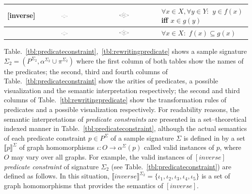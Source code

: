 \documentclass{eceasst}
\begin{document}
\begin{table}[h]
\begin{center}
\begin{tabular}{| l | c | c | p{6cm} | }
    [inverse] & \includegraphics[width=0.13\textwidth]{inv_1.pdf} & \includegraphics[width=0.16\textwidth]{inv_vis.pdf} & $\forall x \in X, \forall y \in Y :$  $y \in f(x)$ iff $x \in g(y) $  \\ \hline 
    [image-inclusion] & \includegraphics[width=0.13\textwidth]{img_1.pdf} & \includegraphics[width=0.16\textwidth]{img_vis.pdf} & $\forall x \in X :$  $f(x) \subseteq g(x) $  \\     
    \hline    
    \end{tabular}
    \end{center}
\end{table}







Table.~\ref{tbl:predicateconstraint},~\ref{tbl:rewritingpredicate} shows a sample signature $\Sigma_2 = (P^{\Sigma_2}, \alpha^{\Sigma_2} \cup \pi^{\Sigma_2})$ where the first column of 
both tables show the names of the predicates; the second, third and fourth columns of Table.~\ref{tbl:predicateconstraint} show the arities of predicates, a possible visualization 
and the semantic interpretation respectively; the second and third columns of Table.~\ref{tbl:rewritingpredicate} show the transformation rules of predicates and a possible visualization respectively.
For readability reasons, the semantic interpretations of \textit{predicate constraints} are presented in a set--theoretical indexed manner in Table.~\ref{tbl:predicateconstraint}, 
although the actual semantics of each predicate constraint $p \in P^{\Sigma}$ of a sample signature $\Sigma$ is defined in \cite{Rutle10} by a set $\llbracket p \rrbracket^{\Sigma}$ of 
graph homomorphisms $\iota : O \rightarrow \alpha^{\Sigma}(p)$ called valid instances of $p$, where $O$ may vary over all graphs. 
For example, the valid instances of $[inverse]$ \textit{predicate constraint} of signature $\Sigma_2$ (see Table.~\ref{tbl:predicateconstraint}) are defined as follows. 
In this situation, $\llbracket inverse \rrbracket^{\Sigma_2} = \{ \iota_1, \iota_2, \iota_3, \iota_4, \iota_5 \}$ is a set of graph homomorphisms that provides the semantics of $[inverse]$. 
\end{document}
